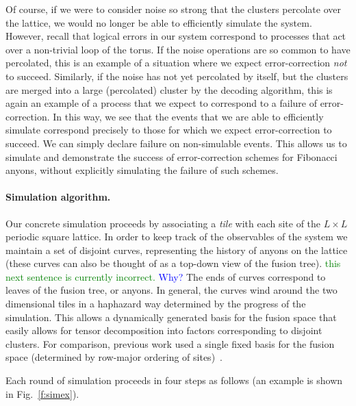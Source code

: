 \documentclass[aps, prl, letterpaper, twocolumn, superscriptaddress, notitlepage, 10pt]{revtex4-1}
\newcommand{\Fref}[1]{Fig.~\ref{#1}}
\newcommand{\cggb}[1]{\textcolor{blue}{#1}}
\newcommand{\stf}[1]{\textcolor{green}{#1}}
\begin{document}
Of course, if we were to consider noise so strong that the clusters percolate over the lattice, 
we would no longer be able to efficiently simulate the system. However, recall that logical 
errors in our system correspond to processes that act over a non-trivial loop of the torus. If 
the noise operations are so common to have percolated, this is an example of a situation 
where we expect error-correction \emph{not} to succeed. Similarly, if the noise has not yet 
percolated by itself, but the clusters are merged into a large (percolated) cluster by the 
decoding algorithm, this is again an example of a process that we expect to correspond to a 
failure of error-correction. In this way, we see that the events that we are able to efficiently 
simulate correspond precisely to those for which we expect error-correction to succeed. We 
can simply declare failure on non-simulable events. This allows us to simulate and 
demonstrate the success of error-correction schemes for Fibonacci anyons, without explicitly 
simulating the failure of such schemes.

\paragraph{Simulation algorithm.}

Our concrete simulation proceeds by associating a \emph{tile} with each site of the 
$L\times L$ periodic square lattice. In order to keep track of the observables of the system 
we maintain a set of disjoint curves, representing the history of anyons on the lattice (these 
curves can also be thought of as a top-down view of the fusion tree). 
\stf{this next sentence is currently incorrect.} \cggb{Why?}
The ends of curves 
correspond to leaves of the fusion tree, or anyons. In general, the curves wind around the two 
dimensional tiles in a haphazard way determined by the progress of the simulation. This 
allows a dynamically generated basis for the fusion space that easily allows for tensor 
decomposition into factors corresponding to disjoint clusters. For comparison, previous work 
used a single fixed basis for the fusion space (determined by row-major ordering of 
sites)~\cite{Brell2013}.

Each round of simulation proceeds in four steps as follows (an example is shown 
in \Fref{f:simex}).
\end{document}
